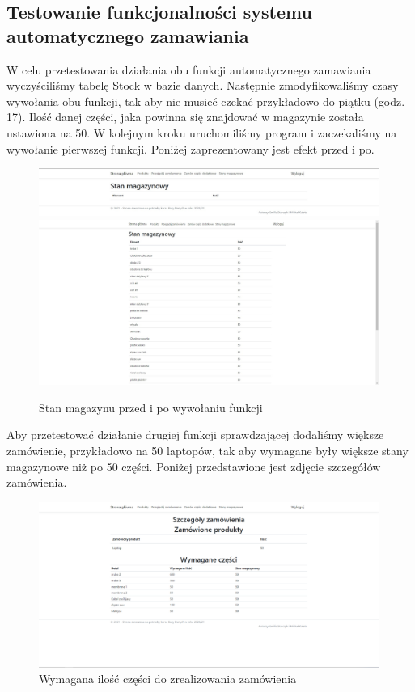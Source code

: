 \documentclass{article}
\begin{document}
\subsection{Testowanie funkcjonalności systemu automatycznego zamawiania}
W celu przetestowania działania obu funkcji automatycznego zamawiania wyczyściliśmy tabelę Stock w
bazie danych. Następnie zmodyfikowaliśmy czasy wywołania obu funkcji, tak aby nie musieć czekać
przykładowo do piątku (godz. 17). Ilość danej części, jaka powinna się znajdować w magazynie została
ustawiona na 50. W kolejnym kroku uruchomiliśmy program i zaczekaliśmy na wywołanie pierwszej
funkcji. Poniżej zaprezentowany jest efekt przed i po.
\begin{figure}[H]
   \centering
   \includegraphics[width=0.99\textwidth,frame]{przed_testem1.jpg}
   \includegraphics[width=0.99\textwidth,frame]{po_teście1.jpg}
   \caption{Stan magazynu przed i po wywołaniu funkcji}
\end{figure}
Aby przetestować działanie drugiej funkcji sprawdzającej dodaliśmy większe zamówienie, przykładowo
na 50 laptopów, tak aby wymagane były większe stany magazynowe niż po 50 części.
Poniżej przedstawione jest zdjęcie szczegółów zamówienia.
\begin{figure}[H]
   \centering
   \includegraphics[width=0.99\textwidth,frame]{wymagane_do zamowienia_50lapkow.png}
   \caption{Wymagana ilość części do zrealizowania zamówienia}
\end{figure}
\end{document}
